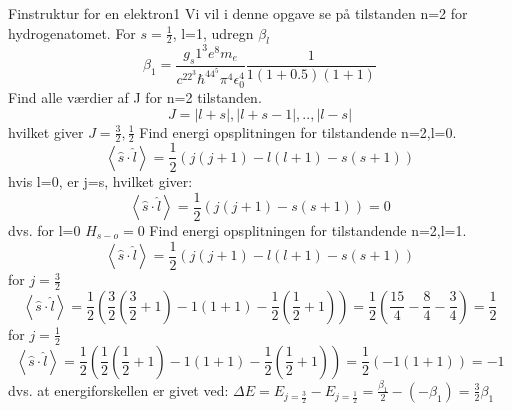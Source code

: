 \documentclass[../../../Atom-ogMolekylefysik.tex]{subfiles}
\begin{document}
\begin{opgave}{Finstruktur for en elektron}{1}
Vi vil i denne opgave se på tilstanden n=2 for hydrogenatomet.
\opg For $s=\frac{1}{2}$, l=1, udregn $\beta_l$
$$\beta_1=\frac{g_s1^3e^8m_e}{c^22^3\hbar^44^5\pi^4\epsilon_0^4}\frac{1}{1(1+0.5)(1+1)}$$
\opg Find alle værdier af J for n=2 tilstanden.
$$J=|l+s|,|l+s-1|,..,|l-s|$$
hvilket giver $J=\frac{3}{2},\frac{1}{2}$
\opg Find energi opsplitningen for tilstandende n=2,l=0.
$$\left<\hat{s}\cdot\hat{l}\right>=\frac{1}{2}(j(j+1)-l(l+1)-s(s+1))$$
hvis l=0, er j=s, hvilket giver:
$$\left<\hat{s}\cdot\hat{l}\right>=\frac{1}{2}(j(j+1)-s(s+1))=0$$
dvs. for l=0 $H_{s-o}=0$
\opg Find energi opsplitningen for tilstandende n=2,l=1.
$$\left<\hat{s}\cdot\hat{l}\right>=\frac{1}{2}(j(j+1)-l(l+1)-s(s+1))$$
for $j=\frac{3}{2}$
$$\left<\hat{s}\cdot\hat{l}\right>=\frac{1}{2}(\frac{3}{2}(\frac{3}{2}+1)-1(1+1)-\frac{1}{2}(\frac{1}{2}+1))=\frac{1}{2}(\frac{15}{4}-\frac{8}{4}-\frac{3}{4})=\frac{1}{2}$$
for $j=\frac{1}{2}$
$$\left<\hat{s}\cdot\hat{l}\right>=\frac{1}{2}(\frac{1}{2}(\frac{1}{2}+1)-1(1+1)-\frac{1}{2}(\frac{1}{2}+1))=\frac{1}{2}(-1(1+1))=-1$$
dvs. at energiforskellen er givet ved:
$\Delta E=E_{j=\frac{3}{2}}-E_{j=\frac{1}{2}}=\frac{\beta_1}{2}-(-\beta_1)=\frac{3}{2}\beta_1$
\end{opgave}
\end{document}
